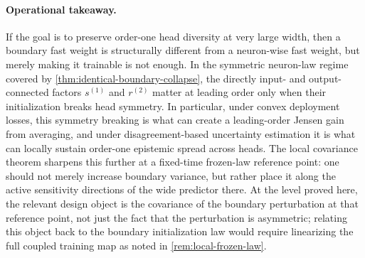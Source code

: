 \documentclass[11pt]{article}
\theoremstyle{definition}
\begin{document}
\paragraph{Operational takeaway.}
If the goal is to preserve order-one head diversity at very large width, then a
boundary fast weight is structurally different from a neuron-wise fast weight,
but merely making it trainable is not enough. In the symmetric neuron-law
regime covered by \cref{thm:identical-boundary-collapse}, the directly
input- and output-connected factors $s^{(1)}$ and $r^{(2)}$ matter at leading
order only when their initialization breaks head symmetry. In particular, under
convex deployment losses, this symmetry breaking is what can create a
leading-order Jensen gain from averaging, and under disagreement-based
uncertainty estimation it is what can locally sustain order-one epistemic spread across
heads. The local covariance theorem sharpens this further at a fixed-time
frozen-law reference point: one should not merely increase boundary variance,
but rather place it along the active sensitivity directions of the wide
predictor there. At the level proved here, the relevant design object is the
covariance of the boundary perturbation at that reference point, not just the
fact that the perturbation is asymmetric; relating this object back to the
boundary initialization law would require linearizing the full coupled training
map as noted in \cref{rem:local-frozen-law}.
\end{document}
